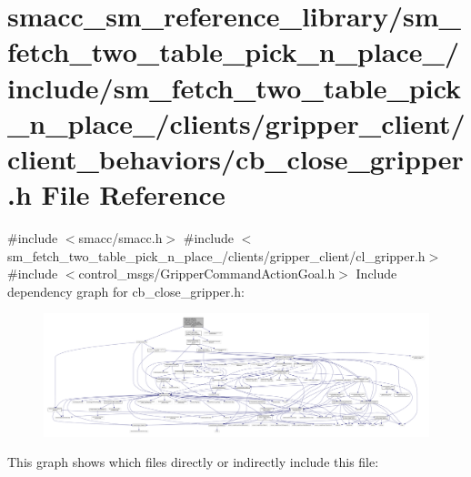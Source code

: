 \hypertarget{sm__fetch__two__table__pick__n__place__1_2include_2sm__fetch__two__table__pick__n__place__1_2cli9fa49da810358bc3da34abe22ec5e233}{}\section{smacc\+\_\+sm\+\_\+reference\+\_\+library/sm\+\_\+fetch\+\_\+two\+\_\+table\+\_\+pick\+\_\+n\+\_\+place\+\_/include/sm\+\_\+fetch\+\_\+two\+\_\+table\+\_\+pick\+\_\+n\+\_\+place\+\_/clients/gripper\+\_\+client/client\+\_\+behaviors/cb\+\_\+close\+\_\+gripper.h File Reference}
\label{sm__fetch__two__table__pick__n__place__1_2include_2sm__fetch__two__table__pick__n__place__1_2cli9fa49da810358bc3da34abe22ec5e233}
{\ttfamily \#include $<$smacc/smacc.\+h$>$}\newline
{\ttfamily \#include $<$sm\+\_\+fetch\+\_\+two\+\_\+table\+\_\+pick\+\_\+n\+\_\+place\+\_/clients/gripper\+\_\+client/cl\+\_\+gripper.\+h$>$}\newline
{\ttfamily \#include $<$control\+\_\+msgs/\+Gripper\+Command\+Action\+Goal.\+h$>$}\newline
Include dependency graph for cb\+\_\+close\+\_\+gripper.\+h\+:
\nopagebreak
\begin{figure}[H]
\begin{center}
\leavevmode
\includegraphics[width=350pt]{sm__fetch__two__table__pick__n__place__1_2include_2sm__fetch__two__table__pick__n__place__1_2clidefca6a1c4bdfc6a15195b439bf7c895}
\end{center}
\end{figure}
This graph shows which files directly or indirectly include this file\+:
